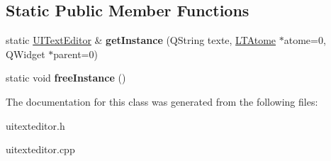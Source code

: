 \subsection*{Static Public Member Functions}
\begin{DoxyCompactItemize}
\item 
static \hyperlink{class_u_i_text_editor}{U\+I\+Text\+Editor} \& {\bfseries get\+Instance} (Q\+String texte, \hyperlink{class_l_t_atome}{L\+T\+Atome} $\ast$atome=0, Q\+Widget $\ast$parent=0)\hypertarget{class_u_i_text_editor_a8139ffce7895ffed491725c874817877}{}\label{class_u_i_text_editor_a8139ffce7895ffed491725c874817877}

\item 
static void {\bfseries free\+Instance} ()\hypertarget{class_u_i_text_editor_add8fc5120efbca71618f21eeecd73538}{}\label{class_u_i_text_editor_add8fc5120efbca71618f21eeecd73538}

\end{DoxyCompactItemize}


The documentation for this class was generated from the following files\+:\begin{DoxyCompactItemize}
\item 
uitexteditor.\+h\item 
uitexteditor.\+cpp\end{DoxyCompactItemize}
